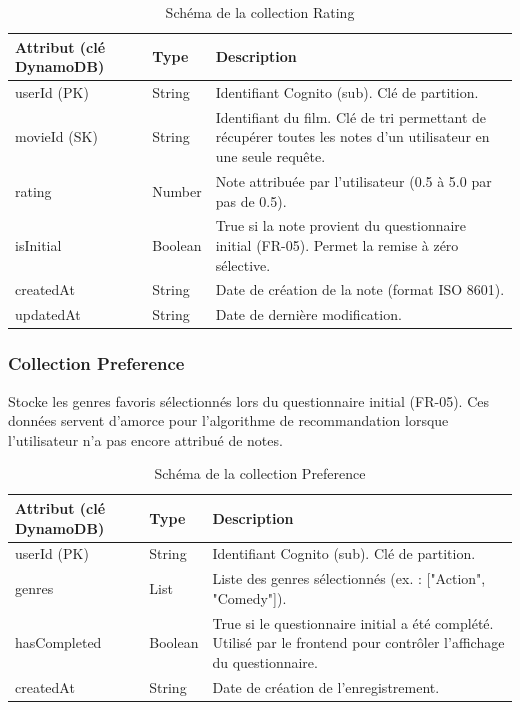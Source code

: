 \documentclass[a4paper,12pt]{report}
\begin{document}
\begin{table}[htbp]
\centering
\begin{tabular}{llp{8cm}}
\toprule
\textbf{Attribut (clé DynamoDB)} & \textbf{Type} & \textbf{Description} \\
\midrule
userId (PK) & String & Identifiant Cognito (sub). Clé de partition. \\

movieId (SK) & String & Identifiant du film. Clé de tri permettant de récupérer toutes les notes d'un utilisateur en une seule requête. \\

rating & Number & Note attribuée par l'utilisateur (0.5 à 5.0 par pas de 0.5). \\

isInitial & Boolean & True si la note provient du questionnaire initial (FR-05). Permet la remise à zéro sélective. \\

createdAt & String & Date de création de la note (format ISO 8601). \\

updatedAt & String & Date de dernière modification. \\

\bottomrule
\end{tabular}

\caption{Schéma de la collection Rating}
\end{table}

\subsubsection{Collection Preference}

Stocke les genres favoris sélectionnés lors du questionnaire initial (FR-05). Ces données servent d'amorce pour l'algorithme de recommandation lorsque l'utilisateur n'a pas encore attribué de notes.

\begin{table}[htbp]
\centering
\begin{tabular}{llp{8cm}}
\toprule
\textbf{Attribut (clé DynamoDB)} & \textbf{Type} & \textbf{Description} \\
\midrule
userId (PK) & String & Identifiant Cognito (sub). Clé de partition. \\

genres & List & Liste des genres sélectionnés (ex. : ["Action", "Comedy"]). \\

hasCompleted & Boolean & True si le questionnaire initial a été complété. Utilisé par le frontend pour contrôler l'affichage du questionnaire. \\

createdAt & String & Date de création de l'enregistrement. \\

\bottomrule
\end{tabular}
\caption{Schéma de la collection Preference}
\end{table}
\newpage
\end{document}
